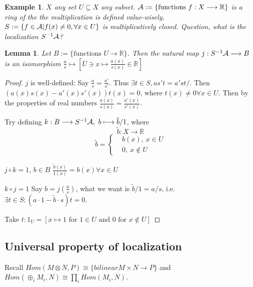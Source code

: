 \documentclass[11pt]{article}
\newtheorem{lemma}[thm]{Lemma}
\newtheorem{ex}[thm]{Example}
\newcommand{\reals}{\mathbb R}
\newcommand{\cala}{{\cal A}}
\newcommand{\lrta}{\longrightarrow}
\begin{document}
\begin{ex}
$X$ any set $U\subseteq X$ any subset.
$\cala:=\{\text{functions } f:X\lrta \reals\}$ is a ring of the the multiplication is defined value-wisely, $S:=\{f\in \cala| f(x)\neq 0, \forall x\in U\}$ is multiplicatively closed. Question, what is the localization $S^{-1}\cala$?
\end{ex}
\begin{lemma}
Let $B:=\{\text{functions }U\lrta \reals\}$.
Then the natural map $j:S^{-1}\cala\lrta B$ is an isomorphism $\frac{a}{s}\mapsto [U\ni x\mapsto\frac{a(x)}{s(x)}\in\reals]$
\end{lemma}
\begin{proof}
$j$ is well-defined:
Say $\frac{a}{s}=\frac{a'}{s'}$. Thus $\exists t\in S, a s' t=a' s t/$. Then $(a(x)s(x)-a'(x)s'(x))t(x)=0$, where $t(x)\neq0\forall x\in U$. Then by the properties of real numbers $\frac{a(x)}{s(x)}=\frac{a'(x)}{s'(x)}$.

Try defining $k:B\lrta S^{-1}\cala,\ b\longmapsto \tilde{b}/1$, where
$$
\tilde{b}:X\lrta \reals
$$
$$
\tilde{b}=\left\{
\begin{aligned}
&b(x),\ x\in U\\
&0, \ x\notin U
\end{aligned}
\right.
$$

$j\circ k=1$, $b\in B$
$\frac{\tilde{b}(x)}{1(x)}=b(x)\forall x\in U$

$k\circ j=1$ Say $b=j(\frac{a}{s})$, what we want is $\tilde{b}/1=a/s$, i.e. $\exists t\in S:(a\cdot 1-\tilde{b}\cdot s)t=0$.

Take $t:1_U=[x\mapsto 1 \text{ for }1\in U \text{ and } 0 \text{ for } x\not \in U]$
\end{proof}

\subsection*{Universal property of localization}
Recall $Hom(M\otimes N, P)\cong \{bilinear M\times N\lrta P\}$ and $Hom(\oplus_{i}M_i,N)\cong \prod_i Hom(M_i,N)$.
\end{document}
